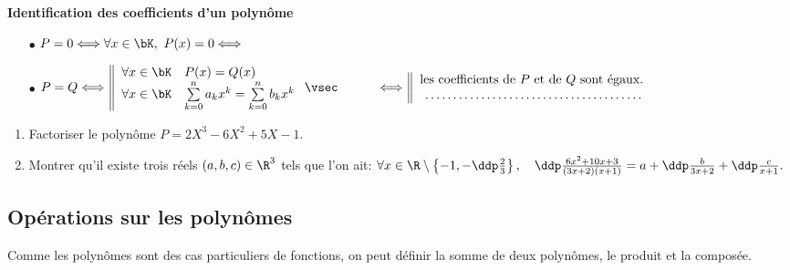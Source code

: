 \documentclass[a4paper, 11pt,reqno]{article}
\begin{document}
{\noindent

	\begin{theorem} \textbf{Identification des coefficients d'un polyn\^ome}
		\begin{itemize}
			\item[$\bullet$] $P=0\Longleftrightarrow \forall x\in\bK,\ P(x)=0\Longleftrightarrow$ \dotfill\vsec

			\item[$\bullet$] $P=Q\Longleftrightarrow \left\|\begin{array}{ll} \forall x\in\bK & P(x)=Q(x) \\ \forall x\in\bK & \sum\limits_{k=0}^n a_kx^k =\sum\limits_{k=0}^n b_k x^k\end{array}\right.
				      \vsec \\ \phantom{sdf} \quad \hspace{0.2cm}\Longleftrightarrow \left\|\begin{array}{l} \hbox{les coefficients de}\ P \hbox{ et de}\ Q\ \hbox{sont \'egaux.} \\
					      \phantom{'} \dotfill
				      \end{array}\right.$
		\end{itemize}
	\end{theorem}
}



{\footnotesize \begin{exercice}
		\begin{enumerate}
			\item Factoriser le polyn\^ome $P=2X^3-6X^2+5X-1$.
			\item Montrer qu'il existe trois r\'eels $(a,b,c)\in\R^3$ tels que l'on ait: $\forall x\in\R\setminus\left\lbrace  -1,-\ddp\frac{2}{3}\right\rbrace,\quad \ddp\frac{6x^2+10x+3}{(3x+2)(x+1)}=a+\ddp\frac{b}{3x+2}+\ddp\frac{c}{x+1}.$
		\end{enumerate}
	\end{exercice}
}

\subsection{Op\'erations sur les polyn\^omes}

\noindent Comme les polyn\^{o}mes sont des cas particuliers de fonctions, on peut d\'efinir la somme de deux polyn\^{o}mes, le produit et la compos\'ee.\vsec
\end{document}
